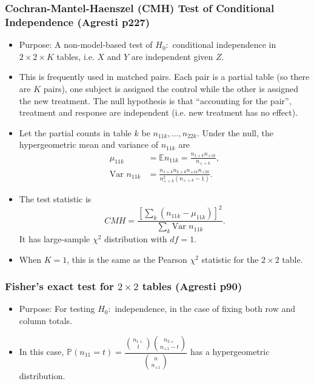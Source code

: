 \documentclass[twoside]{article}
\newcommand\bbE{\mathbb{E}}
\newcommand\bbP{\mathbb{P}}
\begin{document}
\subsubsection*{Cochran-Mantel-Haenszel (CMH) Test of Conditional Independence (Agresti p227)}
\begin{itemize}
\item Purpose: A non-model-based test of $H_0:$ conditional independence in $2 \times 2 \times K$ tables, i.e. $X$ and $Y$ are independent given $Z$.

\item This is frequently used in matched pairs. Each pair is a partial table (so there are $K$ pairs), one subject is assigned the control while the other is assigned the new treatment. The null hypothesis is that ``accounting for the pair'', treatment and response are independent (i.e. new treatment has no effect).

\item Let the partial counts in table $k$ be $n_{11k}, \dots, n_{22k}$. Under the null, the hypergeometric mean and variance of $n_{11k}$ are
\begin{align*}
\mu_{11k} &= \bbE n_{11k} = \frac{n_{1+k} n_{+1k}}{n_{++k}}, \\ 
\text{Var } n_{11k} &= \frac{n_{1+k}n_{2+k}n_{+1k}n_{+2k}}{n_{++k}^2 (n_{++k} - 1)}.
\end{align*}

\item The test statistic is
\begin{equation*}
CMH = \frac{\left[ \sum_{k} (n_{11k} - \mu_{11k}) \right]^2}{\sum_k \text{Var } n_{11k}}.
\end{equation*}
It has large-sample $\chi^2$ distribution with $df = 1$.

\item When $K=1$, this is the same as the Pearson $\chi^2$ statistic for the $2 \times 2$ table.
\end{itemize}

\subsubsection*{Fisher's exact test for $2 \times 2$ tables (Agresti p90)}
\begin{itemize}
\item Purpose: For testing $H_0:$ independence, in the case of fixing both row and column totals.

\item In this case, $\bbP(n_{11} = t) = \dfrac{\binom{n_{1+}}{t} \binom{n_{2+}}{n_{+1}-t}}{\binom{n}{n_{+1}}}$ has a hypergeometric distribution.
\end{itemize}
\end{document}
